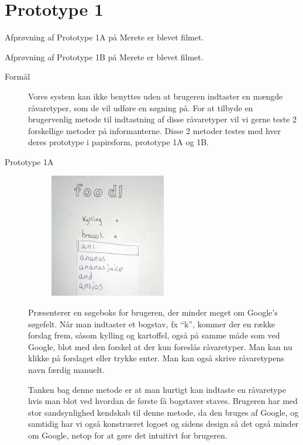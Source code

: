 \section{Prototype 1}
\label{ap:prototype1}

Afprøvning af Prototype 1A på Merete er blevet filmet\cite{prototype1amerete}.

Afprøvning af Prototype 1B på Merete er blevet filmet\cite{prototype1bmerete}.

\begin{description}
\item[Formål] Vores system kan ikke benyttes uden at brugeren indtaster en mængde råvaretyper, som de vil udføre en søgning på. For at tilbyde en brugervenlig metode til indtastning af disse råvaretyper vil vi gerne teste 2 forskellige metoder på informanterne. Disse 2 metoder testes med hver deres prototype i papirsform, prototype 1A og 1B.
\item[Prototype 1A]
\begin{figure}[H]
\centering
\includegraphics[width=0.5\textwidth]{billeder/prototyper/prototype1a.jpg}
\label{fig:prototype1a}
\end{figure}

Præsenterer en søgeboks for brugeren, der minder meget om Google’s søgefelt. Når man indtaster et bogstav, fx “k”, kommer der en række forslag frem, såsom kylling og kartoffel, også på samme måde som ved Google, blot med den forskel at der kun foreslås råvaretyper. Man kan nu klikke på forslaget eller trykke enter. Man kan også skrive råvaretypens navn færdig manuelt.

Tanken bag denne metode er at man hurtigt kan indtaste en råvaretype hvis man blot ved hvordan de første få bogstaver staves. Brugeren har med stor sandsynlighed kendskab til denne metode, da den bruges af Google, og samtidig har vi også konstrueret logoet og sidens design så det også minder om Google, netop for at gøre det intuitivt for brugeren.


\end{description}
